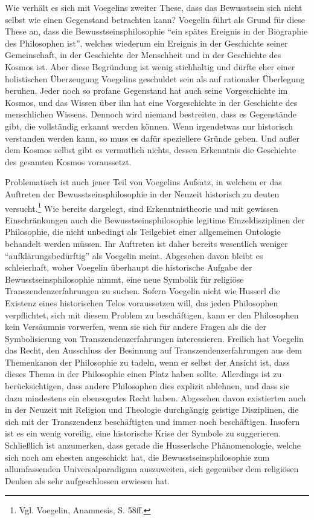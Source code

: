 Wie verhält es sich mit Voegelins zweiter These, dass das Bewusstsein sich
nicht selbst wie einen Gegenstand betrachten kann? Voegelin führt als Grund
für diese These an, dass die Bewusstseinsphilosophie "`ein spätes Ereignis in
der Biographie des Philosophen ist"', welches wiederum ein Ereignis in der
Geschichte seiner Gemeinschaft, in der Geschichte der Menschheit und in der
Geschichte des Kosmos ist. Aber diese Begründung ist wenig stichhaltig und
dürfte eher einer holistischen Überzeugung Voegelins geschuldet sein als auf
rationaler Überlegung beruhen. Jeder noch so profane Gegenstand hat auch seine
Vorgeschichte im Kosmos, und das Wissen über ihn hat eine Vorgeschichte in der
Geschichte des menschlichen Wissens. Dennoch wird niemand bestreiten, dass es
Gegenstände gibt, die vollständig erkannt werden können. Wenn irgendetwas nur
historisch verstanden werden kann, so muss es dafür speziellere Gründe geben.
Und außer dem Kosmos selbst gibt es vermutlich nichts, dessen Erkenntnis die
Geschichte des gesamten Kosmos voraussetzt.

Problematisch ist auch jener Teil von Voegelins Aufsatz, in welchem er das
Auftreten der Bewusstseinsphilosophie in der Neuzeit historisch zu deuten
versucht.\footnote{Vgl. Voegelin, Anamnesis, S. 58ff.} Wie bereits dargelegt,
sind Erkenntnistheorie und mit gewissen Einschränkungen auch die
Bewusstseinsphilosophie legitime Einzeldisziplinen der Philosophie, die nicht
unbedingt als Teilgebiet einer allgemeinen Ontologie behandelt werden müssen.
Ihr Auftreten ist daher bereits wesentlich weniger "`aufklärungsbedürftig"'
als Voegelin meint. Abgesehen davon bleibt es schleierhaft, woher Voegelin
überhaupt die historische Aufgabe der Bewusstseinsphilosophie nimmt, eine neue
Symbolik für religiöse Transzendenzerfahrungen zu suchen. Sofern Voegelin
nicht wie Husserl die Existenz eines historischen Telos voraussetzen will, das
jeden Philosophen verpflichtet, sich mit diesem Problem zu beschäftigen, kann
er den Philosophen kein Versäumnis vorwerfen, wenn sie sich für andere Fragen
als die der Symbolisierung von Transzendenzerfahrungen interessieren. Freilich
hat Voegelin das Recht, den Ausschluss der Besinnung auf
Transzendenzerfahrungen aus dem Themenkanon der Philosophie zu tadeln, wenn er
selbst der Ansicht ist, dass dieses Thema in der Philosophie einen Platz haben
sollte. Allerdings ist zu berücksichtigen, dass andere Philosophen dies
explizit ablehnen, und dass sie dazu mindestens ein ebensogutes Recht haben.
Abgesehen davon existierten auch in der Neuzeit mit Religion und Theologie
durchgängig geistige Disziplinen, die sich mit der Transzendenz beschäftigten
und immer noch beschäftigen.  Insofern ist es ein wenig voreilig, eine
historische Krise der Symbole zu suggerieren.  Schließlich ist anzumerken,
dass gerade die Husserlsche Phänomenologie, welche sich noch am ehesten
angeschickt hat, die Bewusstseinsphilosophie zum allumfassenden
Universalparadigma auszuweiten, sich gegenüber dem religiösen Denken als sehr
aufgeschlossen erwiesen hat.

